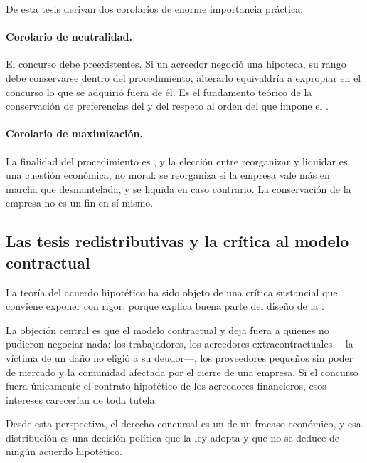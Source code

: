 De esta tesis derivan dos corolarios de enorme importancia práctica:

\paragraph{Corolario de neutralidad.} El concurso debe  preexistentes. Si un acreedor negoció una hipoteca, su rango debe conservarse dentro
del procedimiento; alterarlo equivaldría a expropiar en el concurso lo que se adquirió fuera de él.
Es el fundamento teórico de la conservación de preferencias del  y del respeto al orden del
 que impone el .

\paragraph{Corolario de maximización.} La finalidad del procedimiento es
, y la elección entre reorganizar y liquidar es una
cuestión económica, no moral: se reorganiza si la empresa vale más en marcha que desmantelada, y se
liquida en caso contrario. La conservación de la empresa no es un fin en sí mismo.

\subsection{Las tesis redistributivas y la crítica al modelo contractual}

La teoría del acuerdo hipotético ha sido objeto de una crítica sustancial que conviene exponer con
rigor, porque explica buena parte del diseño de la \LIR{}.

La objeción central es que el modelo contractual  y deja fuera a quienes no pudieron negociar nada: los trabajadores, los acreedores
extracontractuales ---la víctima de un daño no eligió a su deudor---, los proveedores pequeños sin
poder de mercado y la comunidad afectada por el cierre de una empresa. Si el concurso fuera
únicamente el contrato hipotético de los acreedores financieros, esos intereses carecerían de toda
tutela.

Desde esta perspectiva, el derecho concursal es un  de un fracaso económico, y esa distribución es una decisión política que la ley adopta y
que no se deduce de ningún acuerdo hipotético.

